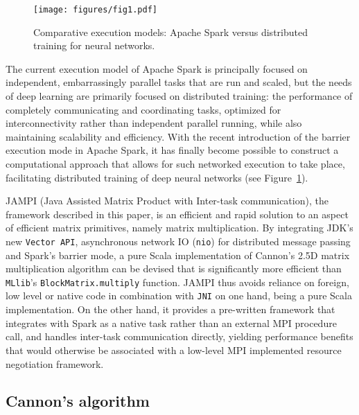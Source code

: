 \documentclass[bdcc,article,submit,moreauthors,pdftex]{Definitions/mdpi}
\begin{document}
\begin{figure}
	\centering
	\texttt{[image: figures/fig1.pdf]}
	\vspace{14pt}
	\caption{Comparative execution models: Apache Spark versus distributed training for neural networks.}
	\label{fig:execution-models}
\end{figure}

The current execution model of Apache Spark is principally focused on independent, embarrassingly parallel tasks that are run and scaled, but the needs of deep learning are primarily focused on distributed training: the performance of completely communicating and coordinating tasks, optimized for interconnectivity rather than independent parallel running, while also maintaining scalability and efficiency. With the recent introduction of the barrier execution mode in Apache Spark, it has finally become possible to construct a computational approach that allows for such networked execution to take place, facilitating distributed training of deep neural networks (see Figure~\ref{fig:execution-models}).

JAMPI (Java Assisted Matrix Product with Inter-task communication), the framework described in this paper, is an efficient and rapid solution to an aspect of efficient matrix primitives, namely matrix multiplication. By integrating JDK's new \texttt{Vector API}, asynchronous network IO (\texttt{nio}) for distributed message passing and Spark's barrier mode, a pure Scala implementation of Cannon's 2.5D matrix multiplication algorithm can be devised that is significantly more efficient than \texttt{MLlib}'s \texttt{BlockMatrix.multiply} function. JAMPI thus avoids reliance on foreign, low level or native code in combination with \texttt{JNI} on one hand, being a pure Scala implementation. On the other hand, it provides a pre-written framework that integrates with Spark as a native task rather than an external MPI procedure call, and handles inter-task communication directly, yielding performance benefits that would otherwise be associated with a low-level MPI implemented resource negotiation framework.

\subsection{Cannon's algorithm} %
\label{sub:cannon_s_algorithm}
\end{document}

